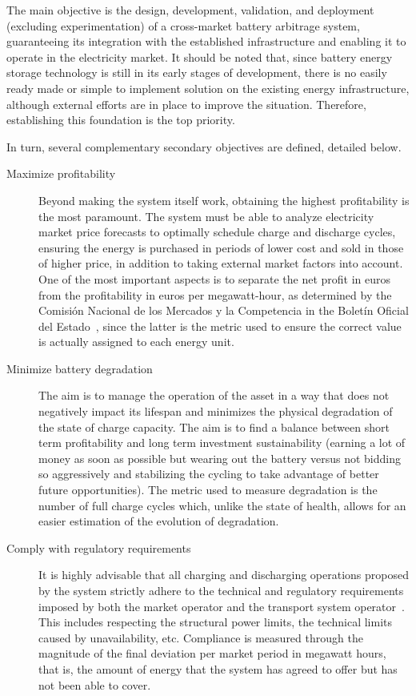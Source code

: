 The main objective is the design, development, validation, and deployment (excluding experimentation) of a cross-market battery arbitrage system, guaranteeing its integration with the established infrastructure and enabling it to operate in the electricity market. It should be noted that, since battery energy storage technology is still in its early stages of development, there is no easily ready made or simple to implement solution on the existing energy infrastructure, although external efforts are in place to improve the situation. Therefore, establishing this foundation is the top priority.

In turn, several complementary secondary objectives are defined, detailed below.

\begin{description}

  \item[Maximize profitability] Beyond making the system itself work, obtaining the highest profitability is the most paramount. The system must be able to analyze electricity market price forecasts to optimally schedule charge and discharge cycles, ensuring the energy is purchased in periods of lower cost and sold in those of higher price, in addition to taking external market factors into account. One of the most important aspects is to separate the net profit in euros from the profitability in euros per megawatt-hour, as determined by the Comisión Nacional de los Mercados y la Competencia in the Boletín Oficial del Estado~\cite{cnmc2025resolucion}, since the latter is the metric used to ensure the correct value is actually assigned to each energy unit.

  \item[Minimize battery degradation] The aim is to manage the operation of the asset in a way that does not negatively impact its lifespan and minimizes the physical degradation of the state of charge capacity. The aim is to find a balance between short term profitability and long term investment sustainability (earning a lot of money as soon as possible but wearing out the battery versus not bidding so aggressively and stabilizing the cycling to take advantage of better future opportunities). The metric used to measure degradation is the number of full charge cycles which, unlike the state of health, allows for an easier estimation of the evolution of degradation.

  \item[Comply with regulatory requirements] It is highly advisable that all charging and discharging operations proposed by the system strictly adhere to the technical and regulatory requirements imposed by both the market operator and the transport system operator~\cite{crespo2004resolucion}. This includes respecting the structural power limits, the technical limits caused by unavailability, etc. Compliance is measured through the magnitude of the final deviation per market period in megawatt hours, that is, the amount of energy that the system has agreed to offer but has not been able to cover.


\end{description}
